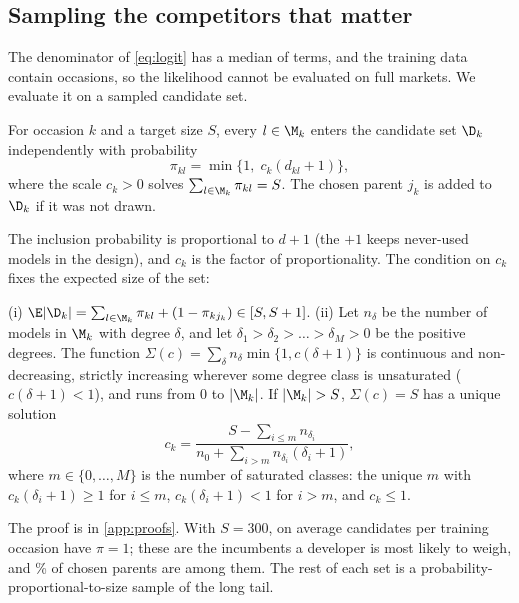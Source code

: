 \subsection{Sampling the competitors that matter}
\label{sec:sampling}

The denominator of \eqref{eq:logit} has a median of \marketMedian{} terms, and the training data contain \nTrain{}
occasions, so the likelihood cannot be evaluated on full markets. We evaluate it on a sampled candidate set.

\begin{definition}
\label{def:pps}
For occasion $k$ and a target size $S$, every $l \in \M_k$ enters the candidate set $\D_k$ independently with
probability
\begin{equation}
  \pi_{kl} = \min\{1,\; c_k (d_{kl} + 1)\},
  \label{eq:pps}
\end{equation}
where the scale $c_k > 0$ solves $\sum_{l \in \M_k} \pi_{kl} = S$. The chosen parent $j_k$ is added to $\D_k$ if it
was not drawn.
\end{definition}

The inclusion probability is proportional to $d+1$ (the $+1$ keeps never-used models in the design), and $c_k$ is
the factor of proportionality. The condition on $c_k$ fixes the expected size of the set:

\begin{lemma}
\label{lem:size}
(i) $\E|\D_k| = \sum_{l \in \M_k} \pi_{kl} + (1 - \pi_{kj_k}) \in [S, S+1]$.
(ii) Let $n_\delta$ be the number of models in $\M_k$ with degree $\delta$, and let $\delta_1 > \delta_2 > \dots >
\delta_M > 0$ be the positive degrees. The function $\Sigma(c) = \sum_\delta n_\delta \min\{1, c(\delta+1)\}$ is
continuous and non-decreasing, strictly increasing wherever some degree class is unsaturated
($c(\delta+1) < 1$), and runs from $0$ to $|\M_k|$. If $|\M_k| > S$, $\Sigma(c) = S$ has a unique solution
\[
  c_k = \frac{S - \sum_{i \le m} n_{\delta_i}}{n_0 + \sum_{i > m} n_{\delta_i}(\delta_i + 1)},
\]
where $m \in \{0, \dots, M\}$ is the number of saturated classes: the unique $m$ with $c_k(\delta_i + 1) \ge 1$ for
$i \le m$, $c_k(\delta_i + 1) < 1$ for $i > m$, and $c_k \le 1$.
\end{lemma}

\noindent The proof is in \cref{app:proofs}. With $S = 300$, on average \piOneMean{} candidates per training
occasion have $\pi = 1$; these are the incumbents a developer is most likely to weigh, and \piOneChosen\% of chosen
parents are among them. The rest of each set is a probability-proportional-to-size sample of the long tail.

